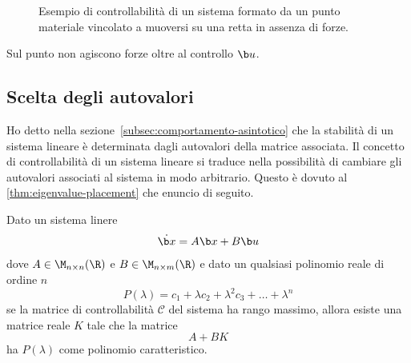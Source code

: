 \begin{example}
\begin{figure}[H]
        \caption[Punto materiale su una retta]{Esempio di controllabilità di
        un sistema formato da un punto materiale vincolato a muoversi su una retta
        in assenza di forze.}%
    \end{figure}


    Sul punto non agiscono forze oltre al controllo $\b u$.
    \label{ex:controllabilità}
\end{example}

\subsection{Scelta degli autovalori}
\label{subsec:scelta-autovalori}
Ho detto nella sezione~\ref{subsec:comportamento-asintotico} che la stabilità
di un sistema lineare è determinata dagli autovalori della matrice associata.
Il concetto di controllabilità di un sistema lineare si traduce nella possibilità
di cambiare gli autovalori associati al sistema in modo arbitrario.
Questo è dovuto al \autoref{thm:eigenvalue-placement} che enuncio di seguito.

\begin{thm}

    Dato un sistema linere
    \begin{equation}
        \dot {\b x} = A\b x + B \b u
        \label{eq:sistema-lineare-controllabile}
    \end{equation}
    dove $A \in \M_{n\times n}(\R)$ e $B \in \M_{n\times m}(\R)$
    e dato un qualsiasi polinomio reale di ordine $n$
    \begin{equation*}
        P(\lambda) = c_1 + \lambda c_2 + \lambda^2 c_3 + \ldots + \lambda^n
    \end{equation*}
    se la matrice di controllabilità $\mathcal C$ del sistema ha rango massimo,
    allora esiste una matrice reale $K$ tale che la matrice
    \begin{equation*}
        A + BK
    \end{equation*}
    ha $P(\lambda)$ come polinomio caratteristico.

    \label{thm:eigenvalue-placement}
\end{thm}

